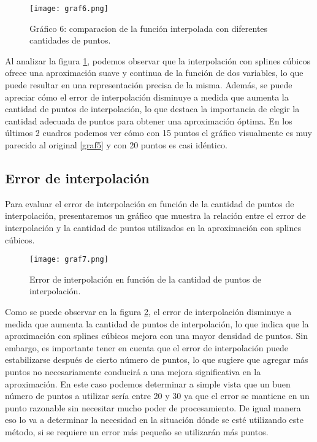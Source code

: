 \documentclass[12pt,a4]{article} %
\begin{document}
\begin{multicols}{2}
\begin{figure}[H] 
    \centering
    \texttt{[image: graf6.png]}
    \caption{Gráfico 6: comparacion de la función interpolada con diferentes cantidades de puntos.}
    \label{graf6}
\end{figure}

Al analizar la figura \ref{graf6}, podemos observar que la interpolación con splines cúbicos ofrece una aproximación suave y continua de la función de dos variables, lo que puede resultar en una representación precisa de la misma. Además, se puede apreciar cómo el error de interpolación disminuye a medida que aumenta la cantidad de puntos de interpolación, lo que destaca la importancia de elegir la cantidad adecuada de puntos para obtener una aproximación óptima. En los últimos 2 cuadros podemos ver cómo con 15 puntos el gráfico visualmente es muy parecido al original \ref{graf5} y con 20 puntos es casi idéntico.

\subsection{Error de interpolación}

Para evaluar el error de interpolación en función de la cantidad de puntos de interpolación, presentaremos un gráfico que muestra la relación entre el error de interpolación y la cantidad de puntos utilizados en la aproximación con splines cúbicos.

\begin{figure}[H] 
    \centering
    \texttt{[image: graf7.png]}
    \caption{Error de interpolación en función de la cantidad de puntos de interpolación.}
    \label{graf7}
\end{figure}

Como se puede observar en la figura \ref{graf7}, el error de interpolación disminuye a medida que aumenta la cantidad de puntos de interpolación, lo que indica que la aproximación con splines cúbicos mejora con una mayor densidad de puntos. Sin embargo, es importante tener en cuenta que el error de interpolación puede estabilizarse después de cierto número de puntos, lo que sugiere que agregar más puntos no necesariamente conducirá a una mejora significativa en la aproximación. En este caso podemos determinar a simple vista que un buen número de puntos a utilizar sería entre 20 y 30 ya que el error se mantiene en un punto razonable sin necesitar mucho poder de procesamiento. De igual manera eso lo va a determinar la necesidad en la situación dónde se esté utilizando este método, si se requiere un error más pequeño se utilizarán más puntos.


\end{multicols}
\end{document}
